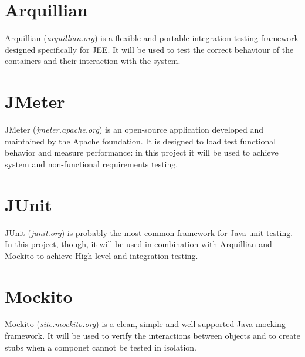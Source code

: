 \section{Arquillian}
Arquillian (\textit{arquillian.org}) is a flexible and portable integration testing framework designed specifically for JEE. It will be used to test the correct behaviour of the containers and their interaction with the system.

\section{JMeter}
JMeter (\textit{jmeter.apache.org}) is an open-source application developed and maintained by the Apache foundation. It is designed to load test functional behavior and measure performance: in this project it will be used to achieve system and non-functional requirements testing.


\section{JUnit}
JUnit (\textit{junit.org}) is probably the most common framework for Java unit testing. In this project, though, it will be used in combination with Arquillian and Mockito to achieve High-level and integration testing.

\section{Mockito}
Mockito (\textit{site.mockito.org}) is a clean, simple and well supported Java mocking framework. It will be used to verify the interactions between objects and to create stubs when a componet cannot be tested in isolation.
